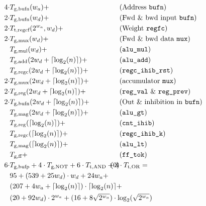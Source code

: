 \begin{align*}
  4 \cdot &\f{T}{g}{bufn}(w_{a}) +                            &&\text{(Address \texttt{bufn})}\\
  2 \cdot &\f{T}{g}{bufn}(w_{d}) +                            &&\text{(Fwd \& bwd input \texttt{bufn})}\\
  2 \cdot &\f{T}{t}{regcf}(2^{w_{a}}, w_{d}) +                &&\text{(Weight \texttt{regfc})}\\
  2 \cdot &\f{T}{g}{mux}(w_{d}) +                             &&\text{(Fwd \& bwd data \texttt{mux})}\\
          &\f{T}{g}{mul}(w_{d}) +                             &&\text{(\texttt{alu\_mul})}\\
          &\f{T}{g}{add}(2w_{d} + \lceil\log_{2}(n)\rceil) +  &&\text{(\texttt{alu\_add})}\\
          &\f{T}{g}{regc}(2w_{d} + \lceil\log_{2}(n)\rceil) + &&\text{(\texttt{regc\_ihib\_rst})}\\
  2 \cdot &\f{T}{g}{mux}(2w_{d} + \lceil\log_{2}(n)\rceil) +  &&\text{(accumulator \texttt{mux})}\\
  2 \cdot &\f{T}{g}{reg}(2w_{d} + \lceil\log_{2}(n)\rceil) +  &&\text{(\texttt{reg\_val} \& \texttt{reg\_prev})}\\
  2 \cdot &\f{T}{g}{bufn}(2w_{d} + \lceil\log_{2}(n)\rceil) + &&\text{(Out \& inhibition in \texttt{bufn})}\\
          &\f{T}{g}{mag}(2w_{d} + \lceil\log_{2}(n)\rceil) +  &&\text{(\texttt{alu\_gt})}\\
          &\f{T}{g}{reg}(\lceil\log_{2}(n)\rceil) +           &&\text{(\texttt{cnt\_ihib})}\\
          &\f{T}{g}{regc}(\lceil\log_{2}(n)\rceil) +          &&\text{(\texttt{regc\_ihib\_k})}\\
          &\f{T}{g}{mag}(\lceil\log_{2}(n)\rceil) +           &&\text{(\texttt{alu\_lt})}\\
          &\f{T}{g}{ff} +                                     &&\text{(\texttt{ff\_tok})}\\
  6 \cdot &\f{T}{g}{bufp} + \rlap{$
  4 \cdot  \f{T}{g}{NOT} +
  6 \cdot  \f{T}{t}{AND} +
  3 \cdot  \f{T}{t}{OR} = $}&\tag{\theequation}\label{eqn:neuron}\\
  \rlap{$95 + (539 + 25w_{d}) \cdot w_{d} + 24w_{a} +$}&\\
  \rlap{$(207 + 4w_{a} + \lceil\log_{2}(n)\rceil) \cdot \lceil\log_{2}(n)\rceil +$}&\\
  \rlap{$(20 + 92w_{d}) \cdot 2^{w_{a}} + (16 + 8\sqrt{2^{w_{a}}}) \cdot \log_{2}(\sqrt{2^{w_{a}}})$}&\\
\end{align*}


